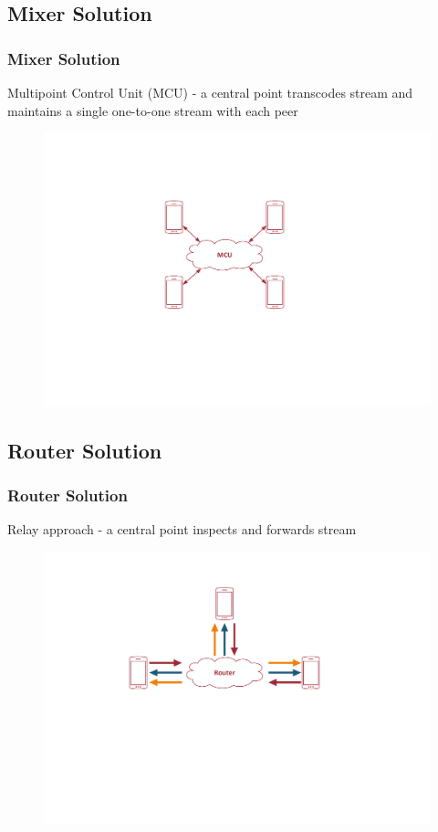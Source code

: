 \documentclass{beamer}
\begin{document}
\subsection{Mixer Solution}
\begin{frame}
	\frametitle{Mixer Solution}
	Multipoint Control Unit (MCU) - a central point transcodes stream and maintains a single one-to-one stream with each peer
	\begin{figure}[h!]
		\centering
		\includegraphics[scale=0.6]{figs/mcu.pdf}
	\end{figure}
\end{frame}
\subsection{Router Solution}
\begin{frame}
	\frametitle{Router Solution}
	 Relay approach - a central point inspects and forwards stream 
	\begin{figure}[h!]
		\centering
		\includegraphics[scale=0.6]{figs/router.pdf}
	\end{figure}
\end{frame}
\end{document}
